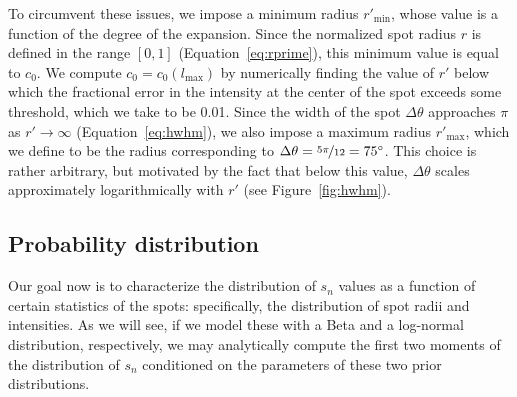 \documentclass[modern]{aastex62}
\begin{document}
To circumvent these issues, we impose a minimum radius
$r'_{\mathrm{min}}$, whose value is
a function of the degree of the expansion. Since the normalized spot radius
$r$ is defined in the range $[0, 1]$ (Equation~\ref{eq:rprime}), this
minimum value is equal to $c_0$. We compute $c_0 = c_0(l_{\mathrm{max}})$
by numerically finding the
value of $r'$ below which the fractional error in the intensity at the
center of the spot exceeds some threshold, which we take to be 0.01.
Since the width of the spot $\Delta\theta$ approaches $\pi$ as
$r' \rightarrow \infty$ (Equation~\ref{eq:hwhm}), we also impose a
maximum radius $r'_{\mathrm{max}}$, which we define to be the radius
corresponding to
$\Delta\theta = \nicefrac{5\pi}{12} = 75^\circ$. This choice is rather
arbitrary, but motivated by the fact that below this value, $\Delta\theta$
scales approximately logarithmically with $r'$ (see Figure~\ref{fig:hwhm}).

\subsection{Probability distribution}
%
Our goal now is to characterize the distribution of $s_{n}$ values as a
function of certain statistics of the spots: specifically, the distribution of
spot radii and intensities. As we will see, if we model these with a Beta and
a log-normal distribution, respectively, we may analytically compute the
first two moments of the distribution of $s_{n}$ conditioned on the parameters
of these two prior distributions.
\end{document}
